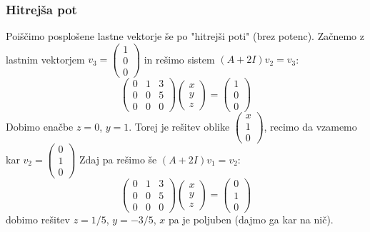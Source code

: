 \documentclass{article}
\begin{document}
\subsubsection*{Hitrejša pot}
Poiščimo posplošene lastne vektorje še po "hitrejši poti" (brez potenc).
Začnemo z lastnim vektorjem $v_3 = \begin{pmatrix} 1 \\ 0 \\ 0 \end{pmatrix}$
in rešimo sistem $(A+2I)v_2 = v_3$:
\begin{equation*}
\begin{pmatrix}
0 & 1 & 3 \\
0 & 0 & 5 \\
0 & 0 & 0
\end{pmatrix}
\begin{pmatrix} x \\ y \\ z
\end{pmatrix} =
\begin{pmatrix} 1 \\ 0 \\ 0 \end{pmatrix}
\end{equation*}
Dobimo enačbe $z=0$, $y=1$. Torej je rešitev oblike
$\begin{pmatrix} x \\ 1 \\ 0 \end{pmatrix}$, recimo da vzamemo kar $v_2 = \begin{pmatrix} 0 \\ 1 \\ 0 \end{pmatrix}$
Zdaj pa rešimo še $(A+2I)v_1 = v_2$:
\begin{equation*}
\begin{pmatrix}
0 & 1 & 3 \\
0 & 0 & 5 \\
0 & 0 & 0
\end{pmatrix}
\begin{pmatrix} x \\ y \\ z
\end{pmatrix} =
\begin{pmatrix} 0 \\ 1 \\ 0 \end{pmatrix}
\end{equation*}
dobimo rešitev $z=1/5$, $y = -3/5$, $x$ pa je poljuben (dajmo ga kar na nič).
\end{document}

